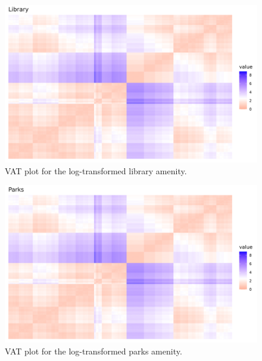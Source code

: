\documentclass[11pt, a4paper]{article}
\begin{document}
{\begin{figure}[H]
\centering
\includegraphics[width=\textwidth]{./vat/library_vat_log.png}
\caption[Library VAT plot]{VAT plot for the log-transformed library amenity.}\label{libraryvat}
\end{figure}








\begin{figure}[H]
\centering
\includegraphics[width=\textwidth]{./vat/parks_vat_log.png}
\caption[Parks VAT plot]{VAT plot for the log-transformed parks amenity.}\label{parksvat}
\end{figure}










}
\end{document}
